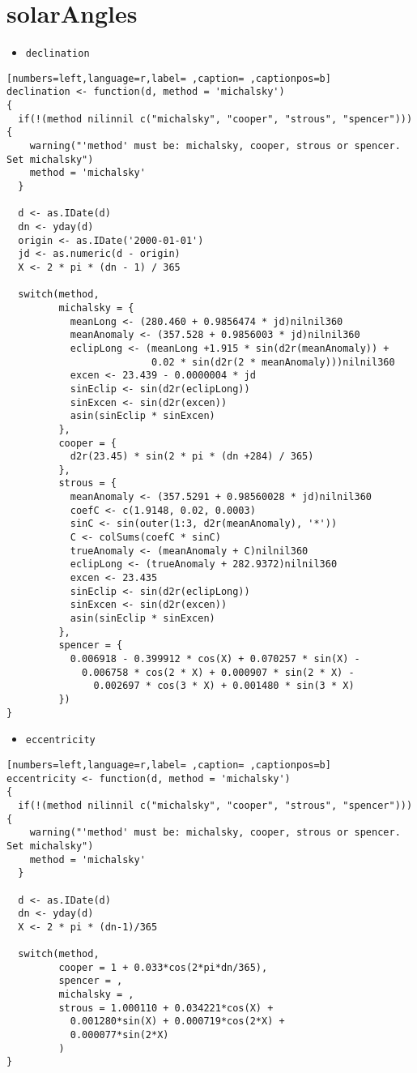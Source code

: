 \section{solarAngles}
\label{sec:org3fc6529}
\begin{itemize}
\item \texttt{declination}
\end{itemize}
\begin{lstlisting}[numbers=left,language=r,label= ,caption= ,captionpos=b]
declination <- function(d, method = 'michalsky')
{
  if(!(method nilinnil c("michalsky", "cooper", "strous", "spencer"))){
    warning("'method' must be: michalsky, cooper, strous or spencer.
Set michalsky")
    method = 'michalsky'
  }

  d <- as.IDate(d)
  dn <- yday(d)
  origin <- as.IDate('2000-01-01')
  jd <- as.numeric(d - origin)
  X <- 2 * pi * (dn - 1) / 365

  switch(method,
         michalsky = {
           meanLong <- (280.460 + 0.9856474 * jd)nilnil360
           meanAnomaly <- (357.528 + 0.9856003 * jd)nilnil360
           eclipLong <- (meanLong +1.915 * sin(d2r(meanAnomaly)) +
                         0.02 * sin(d2r(2 * meanAnomaly)))nilnil360
           excen <- 23.439 - 0.0000004 * jd
           sinEclip <- sin(d2r(eclipLong))
           sinExcen <- sin(d2r(excen))
           asin(sinEclip * sinExcen)
         },
         cooper = {
           d2r(23.45) * sin(2 * pi * (dn +284) / 365)
         },
         strous = {
           meanAnomaly <- (357.5291 + 0.98560028 * jd)nilnil360
           coefC <- c(1.9148, 0.02, 0.0003)
           sinC <- sin(outer(1:3, d2r(meanAnomaly), '*'))
           C <- colSums(coefC * sinC)
           trueAnomaly <- (meanAnomaly + C)nilnil360
           eclipLong <- (trueAnomaly + 282.9372)nilnil360
           excen <- 23.435
           sinEclip <- sin(d2r(eclipLong))
           sinExcen <- sin(d2r(excen))
           asin(sinEclip * sinExcen)
         },
         spencer = {
           0.006918 - 0.399912 * cos(X) + 0.070257 * sin(X) -
             0.006758 * cos(2 * X) + 0.000907 * sin(2 * X) -
               0.002697 * cos(3 * X) + 0.001480 * sin(3 * X)           
         })
}
\end{lstlisting}
\begin{itemize}
\item \texttt{eccentricity}
\end{itemize}
\begin{lstlisting}[numbers=left,language=r,label= ,caption= ,captionpos=b]
eccentricity <- function(d, method = 'michalsky')
{
  if(!(method nilinnil c("michalsky", "cooper", "strous", "spencer"))){
    warning("'method' must be: michalsky, cooper, strous or spencer. Set michalsky")
    method = 'michalsky'
  }

  d <- as.IDate(d)
  dn <- yday(d)
  X <- 2 * pi * (dn-1)/365

  switch(method,
         cooper = 1 + 0.033*cos(2*pi*dn/365),
         spencer = , 
         michalsky = , 
         strous = 1.000110 + 0.034221*cos(X) +
           0.001280*sin(X) + 0.000719*cos(2*X) +
           0.000077*sin(2*X)
         )
}
\end{lstlisting}
